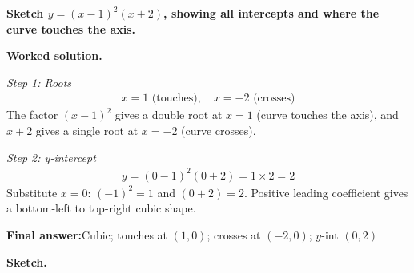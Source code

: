 \documentclass[11pt]{article}
\newcommand{\question}[1]{\par\medskip\noindent\textbf{#1}\par}
\begin{document}
\question{Sketch \( y = (x-1)^2(x+2) \), showing all intercepts and where the curve touches the axis.}

\textbf{Worked solution.}

\textit{Step 1: Roots}
\[\begin{gathered}
x = 1 \text{ (touches)}, \quad x = -2 \text{ (crosses)}
\end{gathered}\]
The factor \( (x-1)^2 \) gives a double root at \( x = 1 \) (curve touches the axis), and \( x + 2 \) gives a single root at \( x = -2 \) (curve crosses).

\textit{Step 2: y-intercept}
\[\begin{gathered}
y = (0-1)^2(0+2) = 1 \times 2 = 2
\end{gathered}\]
Substitute \( x = 0 \): \( (-1)^2 = 1 \) and \( (0+2) = 2 \). Positive leading coefficient gives a bottom-left to top-right cubic shape.

\begin{answerbox}
\textbf{Final answer:}\quad Cubic; touches at \(\displaystyle (1,0)\); crosses at \(\displaystyle (-2,0)\); \(\displaystyle y\)-int \(\displaystyle (0,2)\)
\end{answerbox}
\textbf{Sketch.}
\end{document}
